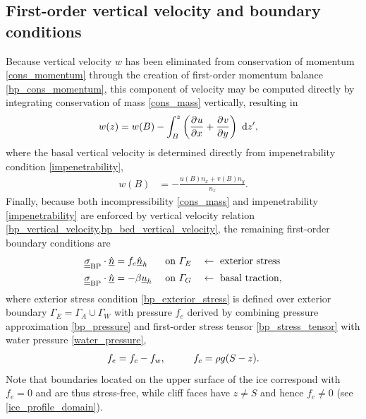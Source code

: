 \subsection{First-order vertical velocity and boundary conditions}

Because vertical velocity $w$ has been eliminated from conservation of momentum \cref{cons_momentum} through the creation of first-order momentum balance \cref{bp_cons_momentum}, this component of velocity may be computed directly by integrating conservation of mass \cref{cons_mass} vertically, resulting in
\begin{align}
  \label{bp_vertical_velocity}
  w(z) &= w(B) - \int_B^z \left( \frac{\partial{^{}} u}{\partial x{^{}} } + \frac{\partial{^{}} v}{\partial y{^{}} } \right) \ \mathrm{d}z',
\end{align}
where the basal vertical velocity is determined directly from impenetrability condition  \cref{impenetrability},
\begin{align}
  \label{bp_bed_vertical_velocity}
  w(B) &= - \frac{u(B) n_x + v(B) n_y}{n_z}. 
\end{align}
Finally, because both incompressibility \cref{cons_mass} and impenetrability \cref{impenetrability} are enforced by vertical velocity relation \cref{bp_vertical_velocity,bp_bed_vertical_velocity}, the remaining first-order boundary conditions are
\begin{align}
  \label{bp_exterior_stress}
  \underline{\underline{\sigma}}_{\text{BP}} \cdot \underline{\hat{n}} &= f_e \underline{\hat{n}}_h &&\text{ on } \varGamma_E &&\leftarrow \text{ exterior stress} \\
  \label{bp_basal_drag}
  \underline{\underline{\sigma}}_{\text{BP}} \cdot \underline{\hat{n}} &= -\beta \underline{u}_h &&\text{ on } \varGamma_G &&\leftarrow \text{ basal traction},
\end{align}
where exterior stress condition \cref{bp_exterior_stress} is defined over exterior boundary $\Gamma_E = \Gamma_A \cup \Gamma_W$ with pressure $f_e$ derived by combining pressure approximation \cref{bp_pressure} and first-order stress tensor \cref{bp_stress_tensor} with water pressure \cref{water_pressure}, 
\begin{align}
  \label{exterior_pressure}
  f_e = f_c - f_w, \hspace{10mm} f_c = \rho g (S - z).
\end{align}
Note that boundaries located on the upper surface of the ice correspond with $f_e = 0$ and are thus stress-free, while cliff faces have $z \neq S$ and hence $f_c \neq 0$ (see \cref{ice_profile_domain}).

